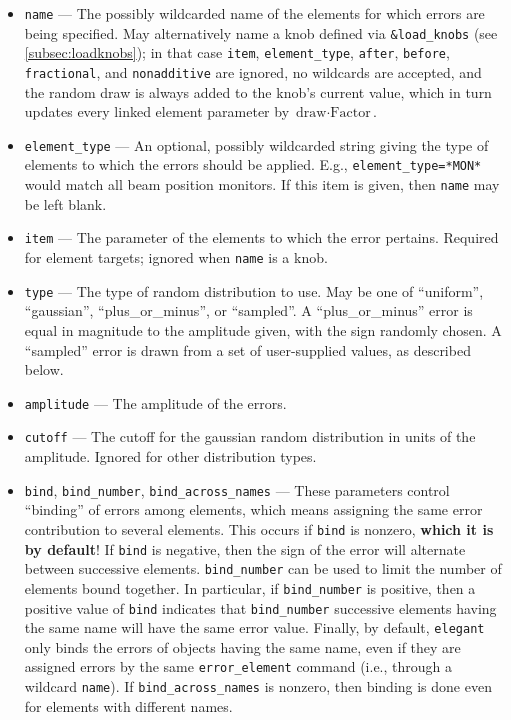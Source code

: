 \documentclass[11pt]{article}
\begin{document}
\begin{itemize}
\item \verb|name| --- The possibly wildcarded name of the elements for which errors are being specified.
 May alternatively name a knob defined via \verb|&load_knobs| (see \ref{subsec:loadknobs}); in that case
 \verb|item|, \verb|element_type|, \verb|after|, \verb|before|, \verb|fractional|, and \verb|nonadditive|
 are ignored, no wildcards are accepted, and the random draw is always added to the knob's current value,
 which in turn updates every linked element parameter by $\textrm{draw}\cdot\textrm{Factor}$.
\item \verb|element_type| --- An optional, possibly wildcarded string giving the type of elements to
 which the errors should be applied.  E.g., \verb|element_type=*MON*| would match all beam position monitors.
 If this item is given, then \verb|name| may be left blank.
\item \verb|item| --- The parameter of the elements to which the error pertains.  Required for element
 targets; ignored when \verb|name| is a knob.
\item \verb|type| --- The type of random distribution to use.  May be one of ``uniform'', ``gaussian'', ``plus\_or\_minus'',
  or ``sampled''.
  A ``plus\_or\_minus'' error is equal in magnitude to the amplitude given, with the sign randomly chosen.
  A ``sampled'' error is drawn from a set of user-supplied values, as described below.
\item \verb|amplitude| --- The amplitude of the errors.
\item \verb|cutoff| --- The cutoff for the gaussian random distribution in units of the amplitude.  Ignored for other distribution types.
\item \verb|bind|, \verb|bind_number|, \verb|bind_across_names| ---
These parameters control ``binding'' of errors among elements, which
means assigning the same error contribution to several elements.  This
occurs if \verb|bind| is nonzero, {\bf which it is by default}! If \verb|bind| is negative, then the
sign of the error will alternate between successive elements.
\verb|bind_number| can be used to limit the number of elements bound
together. In particular, if \verb|bind_number| is positive, then a
positive value of \verb|bind| indicates that \verb|bind_number|
successive elements having the same name will have the same error
value.  Finally, by default, {\tt elegant} only binds the errors of
objects having the same name, even if they are assigned errors by 
the same \verb|error_element| command (i.e., through a wildcard \verb|name|).
If \verb|bind_across_names| is nonzero, then binding is done even for elements
with different names.


\end{itemize}
\end{document}
